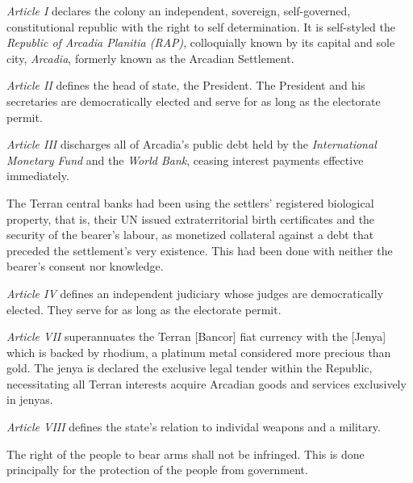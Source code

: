 
\startitemize[5]
\item {\it Article I} declares the colony an independent, sovereign, self-governed, constitutional republic with the right to self determination. It is self-styled the {\it Republic of Arcadia Planitia (RAP)}, colloquially known by its capital and sole city, {\it Arcadia}, formerly known as the Arcadian Settlement.

\item {\it Article II} defines the head of state, the President. The President and his secretaries are democratically elected and serve for as long as the electorate permit.

\item {\it Article III} discharges all of Arcadia's public debt held by the {\it International Monetary Fund} and the {\it World Bank}, ceasing interest payments effective immediately. 

The Terran central banks had been using the settlers' registered biological property, that is, their UN issued extraterritorial birth certificates and the security of the bearer's labour, as monetized collateral against a debt that preceded the settlement's very existence. This had been done with neither the bearer's consent nor knowledge.

\item {\it Article IV} defines an independent judiciary whose judges are democratically elected. They serve for as long as the electorate permit.

\item {\it Article VII} superannuates the Terran [Bancor] fiat currency with the [Jenya] which is backed by rhodium, a platinum metal considered more precious than gold. The jenya is declared the exclusive legal tender within the Republic, necessitating all Terran interests acquire Arcadian goods and services exclusively in jenyas.

\item {\it Article VIII} defines the state's relation to individal weapons and a military. 

The right of the people to bear arms shall not be infringed. This is done principally for the protection of the people from government.

